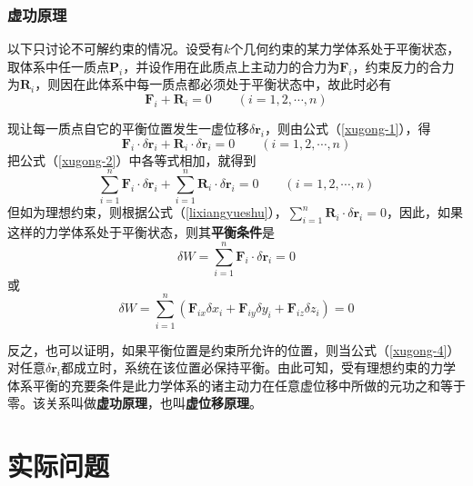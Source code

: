 \documentclass[withoutpreface,bwprint]{cumcmthesis} %
\begin{document}
\subsubsection{虚功原理}
\par 以下只讨论不可解约束的情况。设受有$k$个几何约束的某力学体系处于平衡状态，取体系中任一质点$\textbf{P}_i$，并设作用在此质点上主动力的合力为$\textbf{F}_i$，约束反力的合力为$\textbf{R}_i$，则因在此体系中每一质点都必须处于平衡状态中，故此时必有
\begin{equation}
	\label{xugong-1}
	\textbf{F}_i + \textbf{R}_i = 0 \qquad (i = 1,2,\cdots,n)
\end{equation}
\par 现让每一质点自它的平衡位置发生一虚位移$\delta \textbf{r}_i$，则由公式（\ref{xugong-1}），得
\begin{equation}
	\label{xugong-2}
	\textbf{F}_i \cdot \delta \textbf{r}_i+ \textbf{R}_i \cdot \delta \textbf{r}_i = 0 \qquad (i = 1,2,\cdots,n)
\end{equation}
把公式（\ref{xugong-2}）中各等式相加，就得到
\begin{equation}
	\label{xugong-3}
	\sum\limits_{i=1}^{n} \textbf{F}_i \cdot \delta \textbf{r}_i+ \sum\limits_{i=1}^{n} \textbf{R}_i \cdot \delta \textbf{r}_i = 0 \qquad (i = 1,2,\cdots,n)
\end{equation}
但如为理想约束，则根据公式（\ref{lixiangyueshu}），$\sum\limits_{i=1}^{n} \textbf{R}_i \cdot \delta \textbf{r}_i = 0$，因此，如果这样的力学体系处于平衡状态，则其\textbf{平衡条件}是
\begin{equation}
	\label{xugong-4}
	\delta W = \sum\limits_{i=1}^{n} \textbf{F}_i \cdot \delta \textbf{r}_i = 0
\end{equation}
或
\begin{equation}
	\label{xugong-5}
	\delta W = \sum\limits_{i=1}^{n} (\textbf{F}_{ix} \delta x_i + \textbf{F}_{iy} \delta y_i + \textbf{F}_{iz} \delta z_i) = 0
\end{equation}
\par 反之，也可以证明，如果平衡位置是约束所允许的位置，则当公式（\ref{xugong-4}）对任意$\delta \textbf{r}_i$都成立时，系统在该位置必保持平衡。由此可知，受有理想约束的力学体系平衡的充要条件是此力学体系的诸主动力在任意虚位移中所做的元功之和等于零。该关系叫做\textbf{虚功原理}，也叫\textbf{虚位移原理}。

\section{实际问题}
\end{document}
